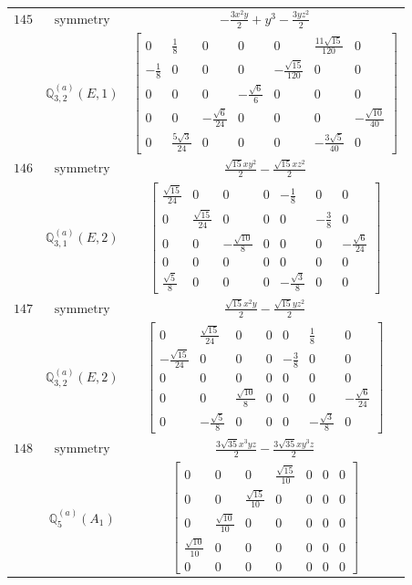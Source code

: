 \documentclass[fleqn,8pt,landscape]{jsarticle}
\begin{document}
\begin{longtable}{ccc}
$ 145 $ & $ \text{symmetry} $ & $ - \frac{3 x^{2} y}{2} + y^{3} - \frac{3 y z^{2}}{2} $ \\
$  $ & $ \mathbb{Q}_{3,2}^{(a)}(E,1) $ & $ \begin{bmatrix} 0 & \frac{1}{8} & 0 & 0 & 0 & \frac{11 \sqrt{15}}{120} & 0 \\ - \frac{1}{8} & 0 & 0 & 0 & - \frac{\sqrt{15}}{120} & 0 & 0 \\ 0 & 0 & 0 & - \frac{\sqrt{6}}{6} & 0 & 0 & 0 \\ 0 & 0 & - \frac{\sqrt{6}}{24} & 0 & 0 & 0 & - \frac{\sqrt{10}}{40} \\ 0 & \frac{5 \sqrt{3}}{24} & 0 & 0 & 0 & - \frac{3 \sqrt{5}}{40} & 0 \end{bmatrix} $ \\ \hline
$ 146 $ & $ \text{symmetry} $ & $ \frac{\sqrt{15} x y^{2}}{2} - \frac{\sqrt{15} x z^{2}}{2} $ \\
$  $ & $ \mathbb{Q}_{3,1}^{(a)}(E,2) $ & $ \begin{bmatrix} \frac{\sqrt{15}}{24} & 0 & 0 & 0 & - \frac{1}{8} & 0 & 0 \\ 0 & \frac{\sqrt{15}}{24} & 0 & 0 & 0 & - \frac{3}{8} & 0 \\ 0 & 0 & - \frac{\sqrt{10}}{8} & 0 & 0 & 0 & - \frac{\sqrt{6}}{24} \\ 0 & 0 & 0 & 0 & 0 & 0 & 0 \\ \frac{\sqrt{5}}{8} & 0 & 0 & 0 & - \frac{\sqrt{3}}{8} & 0 & 0 \end{bmatrix} $ \\ \hline
$ 147 $ & $ \text{symmetry} $ & $ \frac{\sqrt{15} x^{2} y}{2} - \frac{\sqrt{15} y z^{2}}{2} $ \\
$  $ & $ \mathbb{Q}_{3,2}^{(a)}(E,2) $ & $ \begin{bmatrix} 0 & \frac{\sqrt{15}}{24} & 0 & 0 & 0 & \frac{1}{8} & 0 \\ - \frac{\sqrt{15}}{24} & 0 & 0 & 0 & - \frac{3}{8} & 0 & 0 \\ 0 & 0 & 0 & 0 & 0 & 0 & 0 \\ 0 & 0 & \frac{\sqrt{10}}{8} & 0 & 0 & 0 & - \frac{\sqrt{6}}{24} \\ 0 & - \frac{\sqrt{5}}{8} & 0 & 0 & 0 & - \frac{\sqrt{3}}{8} & 0 \end{bmatrix} $ \\ \hline
$ 148 $ & $ \text{symmetry} $ & $ \frac{3 \sqrt{35} x^{3} y z}{2} - \frac{3 \sqrt{35} x y^{3} z}{2} $ \\
$  $ & $ \mathbb{Q}_{5}^{(a)}(A_{1}) $ & $ \begin{bmatrix} 0 & 0 & 0 & \frac{\sqrt{15}}{10} & 0 & 0 & 0 \\ 0 & 0 & \frac{\sqrt{15}}{10} & 0 & 0 & 0 & 0 \\ 0 & \frac{\sqrt{10}}{10} & 0 & 0 & 0 & 0 & 0 \\ \frac{\sqrt{10}}{10} & 0 & 0 & 0 & 0 & 0 & 0 \\ 0 & 0 & 0 & 0 & 0 & 0 & 0 \end{bmatrix} $ \\ \hline

\end{longtable}
\end{document}
